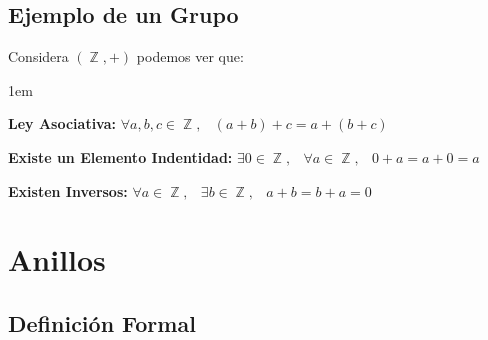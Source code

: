 \documentclass[12pt, fleqn]{report}                             %
\newenvironment{Indentation}[1][0.75em]                         %
        {\begin{adjustwidth}{#1}{}}                                 %
        {\end{adjustwidth}}                                         %
\DeclareMathOperator \Space     {\quad}                         %
\DeclareMathOperator \MiniSpace {\;}                            %
\theoremstyle{break}                                            %
\DeclareMathOperator \Integers     {\mathbb{Z}}                 %
\begin{document}
            \subsection{Ejemplo de un Grupo}

                Considera $(\Integers, +)$ podemos ver que:
                \begin{Indentation}[1em]
                \begin{itemize}
                \small{
                    
                    \item 
                        \textbf{Ley Asociativa:}
                        $\forall a, b, c \in \Integers, \MiniSpace (a + b) + c = a + (b + c)$

                    \item 
                        \textbf{Existe un Elemento Indentidad:}
                        $\exists 0 \in \Integers, \MiniSpace
                            \forall a \in \Integers, \MiniSpace 0 + a = a + 0 = a$

                    \item 
                        \textbf{Existen Inversos:}
                        $\forall a \in \Integers, \MiniSpace
                                \exists b \in \Integers, \MiniSpace
                                    a + b = b + a = 0$

                }
                \end{itemize}
                \end{Indentation}







        \clearpage
        \section{Anillos}

            \subsection{Definición Formal}
\end{document}
